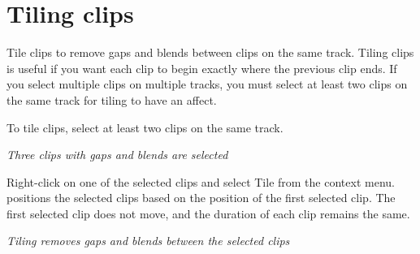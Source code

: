 \chapter{Tiling clips}
\hypertarget{md__hey_tea_9_2_library_2_package_cache_2com_8unity_8timeline_0d1_87_85_2_documentation_0i_2clp__tile}{}\label{md__hey_tea_9_2_library_2_package_cache_2com_8unity_8timeline_0d1_87_85_2_documentation_0i_2clp__tile}
\label{md__hey_tea_9_2_library_2_package_cache_2com_8unity_8timeline_0d1_87_85_2_documentation_0i_2clp__tile_autotoc_md4628}%
%
 Tile clips to remove gaps and blends between clips on the same track. Tiling clips is useful if you want each clip to begin exactly where the previous clip ends. If you select multiple clips on multiple tracks, you must select at least two clips on the same track for tiling to have an affect.

To tile clips, select at least two clips on the same track.



{\itshape Three clips with gaps and blends are selected}

Right-\/click on one of the selected clips and select Tile from the context menu.  positions the selected clips based on the position of the first selected clip. The first selected clip does not move, and the duration of each clip remains the same.



{\itshape Tiling removes gaps and blends between the selected clips} 
